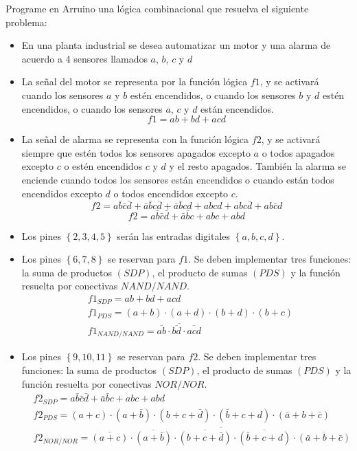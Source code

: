 Programe en Arruino una lógica combinacional que resuelva el siguiente problema:
\begin{itemize}
    \item En una planta industrial se desea automatizar un motor y una alarma de acuerdo a 4 sensores llamados $a$, $b$, $c$ y $d$ 
    \item La señal del motor se representa por la función lógica $f1$, y se activará  cuando los sensores $a$ y $b$ estén encendidos, o cuando los sensores $b$ y $d$ estén encendidos, o cuando los sensores $a$, $c$ y $d$ están encendidos.
    \begin{equation*}
        f1 = ab + bd + acd
    \end{equation*}
    \item La señal de  alarma se representa con la función lógica $f2$, y se activará siempre que estén todos los sensores apagados excepto $a$ o todos apagados excepto $c$ o estén encendidos $c$ y $d$ y el resto apagados. También la alarma se enciende cuando todos los sensores están encendidos o cuando están todos encendidos excepto $d$ o todos encendidos excepto $c$.
    \begin{equation*}
        f2 = a\bar{b}\bar{c}\bar{d} + \bar{a}\bar{b}c\bar{d} + \bar{a}\bar{b}cd + abcd + abc\bar{d} + ab\bar{c}d
    \end{equation*}
    \begin{equation*}
        f2 = a\bar{b}\bar{c}\bar{d} + \bar{a}\bar{b}c + abc + abd
    \end{equation*}
    \item Los pines $\left\lbrace 2,3,4,5\right\rbrace$ serán las entradas digitales $\left\lbrace a,b,c,d\right\rbrace$.
    \item Los pines $\left\lbrace 6,7,8\right\rbrace $ se reservan para $f1$. Se deben implementar tres funciones: la suma de productos $(SDP)$, el producto de sumas $(PDS)$ y la función resuelta por conectivas $NAND/NAND$. 
    \begin{align*}
        &f1_{SDP} = ab + bd + acd\\
        &f1_{PDS} = (a+b)\cdot (a+d)\cdot (b+d)\cdot (b+c)\\
        &f1_{NAND/NAND} = \overline{\overline{ab} \cdot \overline{bd} \cdot \overline{acd}}
    \end{align*}
    \item Los pines $\left\lbrace 9,10,11\right\rbrace $ se reservan para $f2$. Se deben implementar tres funciones: la suma de productos $(SDP)$, el producto de sumas $(PDS)$ y la función resuelta por conectivas $NOR/NOR$.
    \begin{align*}
        &f2_{SDP} = a\bar{b}\bar{c}\bar{d} + \bar{a}\bar{b}c + abc + abd\\
        &f2_{PDS} = (a+c)\cdot (a+\bar{b})\cdot(b+c+\bar{d})\cdot(\bar{b}+c+d)\cdot (\bar{a}+b+\bar{c})\\
        &f2_{NOR/NOR} = \overline{\overline{(a+c)}\cdot \overline{(a+\bar{b})}\cdot \overline{(b+c+\bar{d})} \cdot \overline{(\bar{b}+c+d)} \cdot \overline{(\bar{a}+b+\bar{c})}}
    \end{align*}
\end{itemize}
 
